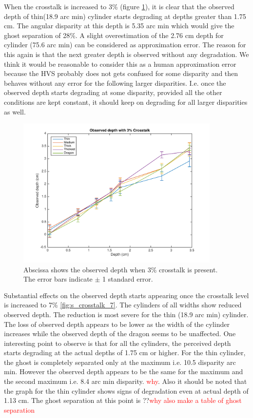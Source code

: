 When the crosstalk is increased to 3\% (figure \ref{fig:s_crosstalk_3}), it is clear that the observed depth of thin(18.9 arc min) cylinder starts degrading at depths greater than 1.75 cm. The angular disparity at this depth is 5.35 arc min which would give the ghost separation of 28\%. A slight overestimation of the 2.76 cm depth for cylinder (75.6 arc min) can be considered as approximation error. The reason for this again is that the next greater depth is observed without any degradation. We think it would be reasonable to consider this as a human approximation error because the HVS probably does not gets confused for some disparity and then behaves without any error for the following larger disparities. I.e. once the observed depth starts degrading at some disparity, provided all the other conditions are kept constant, it should keep on degrading for all larger disparities as well.
\begin{figure}[H]
\centering
    \includegraphics[width=0.9\textwidth]{./Template_Figures/s_crosstalk_3}
    \caption{Abscissa shows the observed depth when 3\% crosstalk is present. The error bars indicate $\pm$ 1 standard error.\label{fig:s_crosstalk_3}}
\end{figure}

Substantial effects on the observed depth starts appearing once the crosstalk level is increased to 7\% \ref{fig:s_crosstalk_7}. The cylinders of all widths show reduced observed depth. The reduction is most severe for the thin (18.9 arc min) cylinder. The loss of observed depth appears to be lower as the width of the cylinder increases while the observed depth of the dragon seems to be unaffected. One interesting point to observe is that for all the cylinders, the perceived depth starts degrading at the actual depths of 1.75 cm or higher. For the thin cylinder, the ghost is completely separated only at the maximum i.e. 10.5 disparity arc min. However the observed depth appears to be the same for the maximum and the second maximum i.e. 8.4 arc min disparity. \textcolor{red}{why}. Also it should be noted that the graph for the thin cylinder shows signs of degradation even at actual depth of 1.13 cm.  The ghost separation at this point is ??\textcolor{red}{why also make a table of ghost separation}

